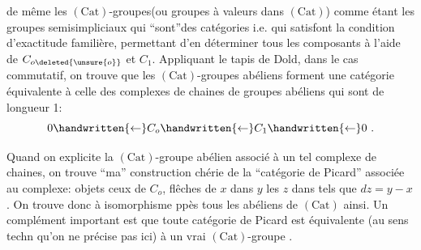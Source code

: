 
de même les $(\mathrm{Cat})$-groupes(ou groupes à valeurs dans $(\mathrm{Cat})$) comme étant les groupes semisimpliciaux qui ``sont''des catégories i.e. qui  satisfont la condition d'exactitude familière, permettant d'en déterminer tous les composants à l'aide de $C_{o\deleted{\unsure{o}}}$ et $C_1$. Appliquant le tapis de Dold, dans le cas commutatif, on trouve que les $(\mathrm{Cat})$-groupes abéliens forment une catégorie équivalente à celle des complexes de chaines de groupes abéliens qui sont de longueur 1:
\[
0\handwritten{\leftarrow}C_o\handwritten{\leftarrow}C_1\handwritten{\leftarrow}0\ .
\]

Quand on explicite la $(\mathrm{Cat})$-groupe abélien associé à un tel complexe de chaines, on trouve ``ma'' construction chérie de la ``catégorie de Picard'' associée au complexe: objets ceux de $C_o$, flêches de $x$ dans $y$ les $z$ dans  tels que $dz=y-x$. On trouve donc à isomorphisme ppès tous les  abéliens de $(\mathrm{Cat})$ ainsi. Un complément important est que toute catégorie de Picard  est équivalente (au sens techn qu'on ne précise pas ici) à  un vrai $(\mathrm{Cat})$-groupe .

